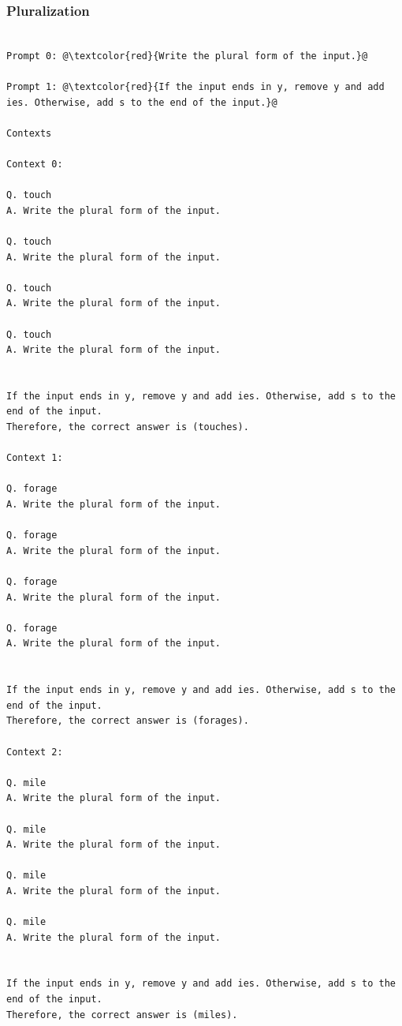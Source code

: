 \documentclass{article} %
\begin{document}
\subsubsection{Pluralization }
\begin{tcolorbox}
\begin{lstlisting}[escapechar=@]

Prompt 0: @\textcolor{red}{Write the plural form of the input.}@

Prompt 1: @\textcolor{red}{If the input ends in y, remove y and add ies. Otherwise, add s to the end of the input.}@

Contexts

Context 0:

Q. touch
A. Write the plural form of the input.

Q. touch
A. Write the plural form of the input.

Q. touch
A. Write the plural form of the input.

Q. touch
A. Write the plural form of the input.


If the input ends in y, remove y and add ies. Otherwise, add s to the end of the input.
Therefore, the correct answer is (touches).

Context 1:

Q. forage
A. Write the plural form of the input.

Q. forage
A. Write the plural form of the input.

Q. forage
A. Write the plural form of the input.

Q. forage
A. Write the plural form of the input.


If the input ends in y, remove y and add ies. Otherwise, add s to the end of the input.
Therefore, the correct answer is (forages).

Context 2:

Q. mile
A. Write the plural form of the input.

Q. mile
A. Write the plural form of the input.

Q. mile
A. Write the plural form of the input.

Q. mile
A. Write the plural form of the input.


If the input ends in y, remove y and add ies. Otherwise, add s to the end of the input.
Therefore, the correct answer is (miles).
\end{lstlisting}
\end{tcolorbox}
\end{document}

